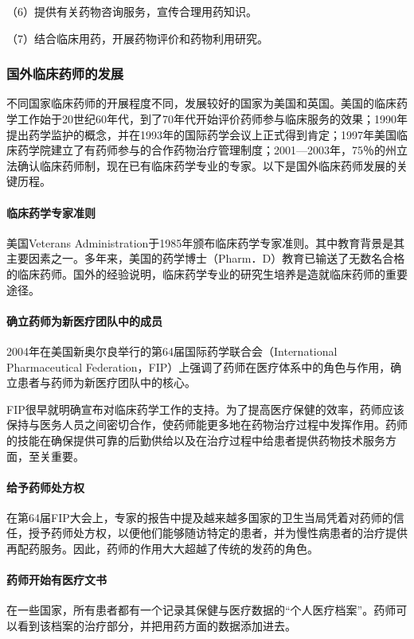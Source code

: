 （6）提供有关药物咨询服务，宣传合理用药知识。

（7）结合临床用药，开展药物评价和药物利用研究。

\subsubsection{国外临床药师的发展}

不同国家临床药师的开展程度不同，发展较好的国家为美国和英国。美国的临床药学工作始于20世纪60年代，到了70年代开始评价药师参与临床服务的效果；1990年提出药学监护的概念，并在1993年的国际药学会议上正式得到肯定；1997年美国临床药学院建立了有药师参与的合作药物治疗管理制度；2001---2003年，75％的州立法确认临床药师制，现在已有临床药学专业的专家。以下是国外临床药师发展的关键历程。
\paragraph{临床药学专家准则}

美国Veterans
Administration于1985年颁布临床药学专家准则。其中教育背景是其主要因素之一。多年来，美国的药学博士（Pharm．D）教育已输送了无数名合格的临床药师。国外的经验说明，临床药学专业的研究生培养是造就临床药师的重要途径。
\paragraph{确立药师为新医疗团队中的成员}

2004年在美国新奥尔良举行的第64届国际药学联合会（International
Pharmaceutical
Federation，FIP）上强调了药师在医疗体系中的角色与作用，确立患者与药师为新医疗团队中的核心。

FIP很早就明确宣布对临床药学工作的支持。为了提高医疗保健的效率，药师应该保持与医务人员之间密切合作，使药师能更多地在药物治疗过程中发挥作用。药师的技能在确保提供可靠的后勤供给以及在治疗过程中给患者提供药物技术服务方面，至关重要。
\paragraph{给予药师处方权}

在第64届FIP大会上，专家的报告中提及越来越多国家的卫生当局凭着对药师的信任，授予药师处方权，以便他们能够随访特定的患者，并为慢性病患者的治疗提供再配药服务。因此，药师的作用大大超越了传统的发药的角色。
\paragraph{药师开始有医疗文书}

在一些国家，所有患者都有一个记录其保健与医疗数据的“个人医疗档案”。药师可以看到该档案的治疗部分，并把用药方面的数据添加进去。
